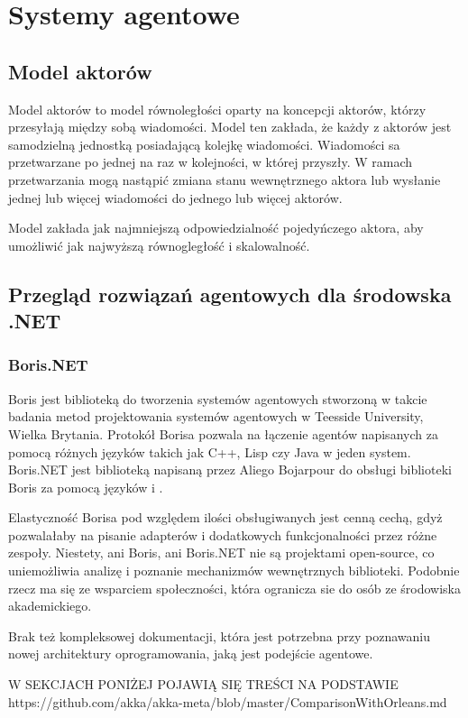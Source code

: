 \chapter{Systemy agentowe}
\section{Model aktorów}
Model aktorów to model równoległości oparty na koncepcji aktorów, którzy przesyłają między sobą wiadomości.
Model ten zakłada, że każdy z aktorów jest samodzielną jednostką posiadającą kolejkę wiadomości. Wiadomości sa przetwarzane po jednej na raz w kolejności, w której przyszły. W ramach przetwarzania mogą nastąpić zmiana stanu wewnętrznego aktora lub wysłanie jednej lub więcej wiadomości do jednego lub więcej aktorów. 

Model zakłada jak najmniejszą odpowiedzialność pojedyńczego aktora, aby umożliwić jak najwyższą równogległość i skalowalność.

\section{Przegląd rozwiązań agentowych dla środowska .NET}
\subsection{Boris.NET}
Boris jest biblioteką do tworzenia systemów agentowych stworzoną w takcie badania metod projektowania systemów agentowych w Teesside University, Wielka Brytania. Protokół Borisa pozwala na łączenie agentów napisanych za pomocą różnych języków takich jak C++, Lisp czy Java w jeden system. Boris.NET jest biblioteką napisaną przez Aliego Bojarpour do obsługi biblioteki Boris za pomocą języków \csh i \fsh. 

Elastyczność Borisa pod względem ilości obsługiwanych jest cenną cechą, gdyż pozwalałaby na pisanie adapterów i dodatkowych funkcjonalności przez różne zespoły. 
Niestety, ani Boris, ani Boris.NET nie są projektami open-source, co uniemożliwia analizę i poznanie mechanizmów wewnętrznych biblioteki. Podobnie rzecz ma się ze wsparciem społeczności, która ogranicza sie do osób ze środowiska akademickiego.

Brak też kompleksowej dokumentacji, która jest potrzebna przy poznawaniu nowej architektury oprogramowania, jaką jest podejście agentowe.

W SEKCJACH PONIŻEJ POJAWIĄ SIĘ TREŚCI NA PODSTAWIE
https://github.com/akka/akka-meta/blob/master/ComparisonWithOrleans.md
